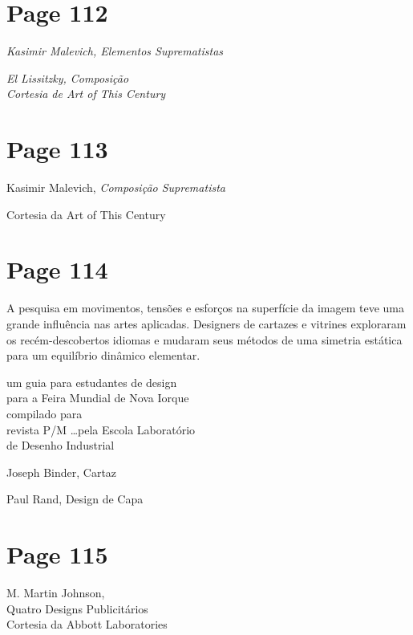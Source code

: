 \documentclass[a4paper]{article}
\begin{document}
\par
{}

\newpage
\section*{Page 112}

\textit{Kasimir Malevich, Elementos Suprematistas}

\textit{El Lissitzky, Composição} \\
\textit{Cortesia de Art of This Century}

\newpage
\section*{Page 113}

Kasimir Malevich, \textit{Composição Suprematista}\par
Cortesia da Art of This Century\par
\vspace*{\fill}

\newpage
\section*{Page 114}

A pesquisa em movimentos, tensões e esforços na superfície da imagem teve uma grande influência nas artes aplicadas. Designers de cartazes e vitrines exploraram os recém-descobertos idiomas e mudaram seus métodos de uma simetria estática para um equilíbrio dinâmico elementar.

um guia para estudantes de design\\
para a Feira Mundial de Nova Iorque\\
compilado para\\
revista P/M \dots pela Escola Laboratório\\
de Desenho Industrial

Joseph Binder, Cartaz

Paul Rand, Design de Capa

\newpage
\section*{Page 115}

\begin{flushleft}
M. Martin Johnson,\\
Quatro Designs Publicitários\\
Cortesia da Abbott Laboratories
\end{flushleft}
\end{document}
